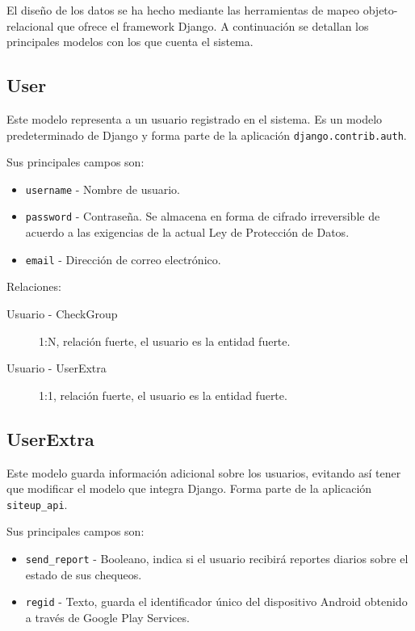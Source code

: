El diseño de los datos se ha hecho mediante las herramientas de mapeo
objeto-relacional que ofrece el framework Django. A continuación se detallan los
principales modelos con los que cuenta el sistema.

\subsection{User}

Este modelo representa a un usuario registrado en el sistema. Es un modelo
predeterminado de Django y forma parte de la aplicación \texttt{django.contrib.auth}.

Sus principales campos son:

\begin{itemize}
\item \texttt{username} - Nombre de usuario.
\item \texttt{password} - Contraseña. Se almacena en forma de cifrado
  irreversible de acuerdo a las exigencias de la actual Ley de Protección de Datos.
\item \texttt{email} - Dirección de correo electrónico.
\end{itemize}

Relaciones:

\begin{description}
\item[Usuario - CheckGroup] 1:N, relación fuerte, el usuario es la entidad fuerte.
\item[Usuario - UserExtra] 1:1, relación fuerte, el usuario es la entidad fuerte.
\end{description}

\subsection{UserExtra}

Este modelo guarda información adicional sobre los usuarios, evitando así tener
que modificar el modelo que integra Django. Forma parte de la aplicación \texttt{siteup\_api}.

Sus principales campos son:

\begin{itemize}
\item \texttt{send\_report} - Booleano, indica si el usuario recibirá reportes
  diarios sobre el estado de sus chequeos.
\item \texttt{regid} - Texto, guarda el identificador único del dispositivo
  Android obtenido a través de Google Play Services.
\end{itemize}

